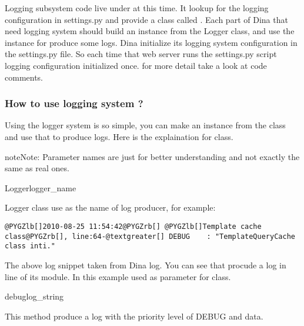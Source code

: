 \documentclass[letterpaper,10pt,english]{manual}
\begin{document}
Logging subsystem code live under  at this time. It lookup for
the logging configuration in settings.py and provide a class called \hyperlink{Logger}{}. Each
part of Dina that need logging system should build an instance from the Logger class,
and use the instance for produce some logs. Dina initialize its logging system configuration
in the settings.py file. So each time that web server runs the settings.py script logging
configuration initialized once. for more detail take a look at code comments.


\subsubsection{How to use logging system ?}

Using the logger system is so simple, you can make an instance from the \hyperlink{Logger}{} class
and use that to produce logs. Here is the explaination for \hyperlink{Logger}{} class.

\begin{notice}{note}{Note:}
Parameter names are just for better understanding and not exactly the same as real ones.
\end{notice}

\hypertarget{Logger}{}\begin{classdesc}{Logger}{logger\_name}\end{classdesc}

Logger class use  as the name of log producer, for example:

\begin{Verbatim}[commandchars=@\[\]]
@PYGZlb[]2010-08-25 11:54:42@PYGZrb[] @PYGZlb[]Template cache class@PYGZrb[], line:64-@textgreater[] DEBUG    : "TemplateQueryCache class inti."
\end{Verbatim}

The above log snippet taken from Dina log. You can see that  procude a 
log in line  of its module. In this example  used as  parameter
for \hyperlink{Logger}{} class.

\hypertarget{Logger.debug}{}\begin{methoddesc}[Logger]{debug}{log\_string}\end{methoddesc}

This method produce a log with the priority level of DEBUG and  data.
\end{document}
